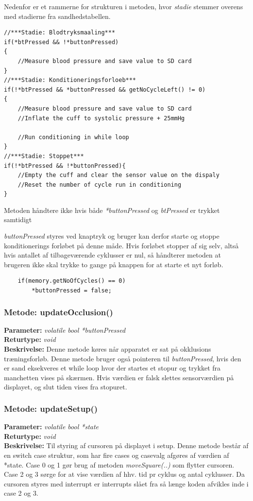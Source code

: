 Nedenfor er et rammerne for strukturen i metoden, hvor \textit{stadie} stemmer overens med stadierne fra sandhedstabellen. 

\begin{lstlisting}
//***Stadie: Blodtryksmaaling***
if(*btPressed && !*buttonPressed)
{
	//Measure blood pressure and save value to SD card
}
//***Stadie: Konditioneringsforloeb***
if(!*btPressed && *buttonPressed && getNoCycleLeft() != 0)
{
	//Measure blood pressure and save value to SD card
	//Inflate the cuff to systolic pressure + 25mmHg
	
	//Run conditioning in while loop 
}
//***Stadie: Stoppet***
if(!*btPressed && !*buttonPressed){
	//Empty the cuff and clear the sensor value on the dispaly 
	//Reset the number of cycle run in conditioning
}

\end{lstlisting}

Metoden håndtere ikke hvis både \textit{*buttonPressed} og \textit{btPressed} er trykket samtidigt

\textit{buttonPressed} styres ved knaptryk og bruger kan derfor starte og stoppe konditionerings forløbet på denne måde. Hvis forløbet stopper af sig selv, altså hvis antallet af tilbageværende cyklusser er nul, så håndterer metoden at brugeren ikke skal trykke to gange på knappen for at starte et nyt forløb. 
\begin{lstlisting}
	if(memory.getNoOfCycles() == 0)
		*buttonPressed = false;
\end{lstlisting}

\subsubsection{Metode: updateOcclusion()}
\textbf{Parameter: } \textit{volatile bool *buttonPressed}
\\ \textbf{Returtype: } \textit{void}
\\ \textbf{Beskrivelse: } Denne metode køres når apparatet er sat på okklusions træningsforløb. Denne metode bruger også pointeren til \textit{buttonPressed}, hvis den er sand eksekveres et while loop hvor der startes et stopur og trykket fra manchetten vises på skærmen. Hvis værdien er falsk slettes sensorværdien på displayet, og slut tiden vises fra stopuret.

\subsubsection{Metode: updateSetup()}
\textbf{Parameter: } \textit{volatile bool *state}
\\ \textbf{Returtype: } \textit{void}
\\ \textbf{Beskrivelse: } Til styring af cursoren på displayet i setup. Denne metode består af en switch case struktur, som har fire cases og casevalg afgøres af værdien af *state. Case 0 og 1 gør brug af metoden \textit{moveSquare(..)} som flytter cursoren. Case 2 og 3 sørge for at vise værdien af hhv. tid pr cyklus og antal cyklusser. Da cursoren styres med interrupt er interrupts slået fra så længe koden afvikles inde i case 2 og 3. 

